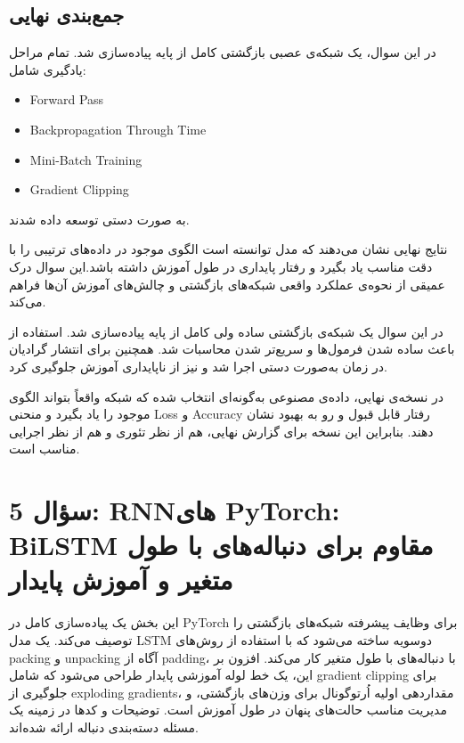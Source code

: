 \documentclass[12pt,a4paper]{article}
\begin{document}
\subsection{جمع‌بندی نهایی}



\begin{tcolorbox}[
colback=softgreen,
colframe=mygreen,
title={نتیجه‌ی نهایی},
fonttitle=\bfseries
]

در این سوال، یک شبکه‌ی عصبی بازگشتی کامل از پایه پیاده‌سازی شد.
تمام مراحل یادگیری شامل:
\begin{itemize}
	\item Forward Pass
	\item Backpropagation Through Time
	\item Mini-Batch Training
	\item Gradient Clipping
\end{itemize}
به صورت دستی توسعه داده شدند.

نتایج نهایی نشان می‌دهند که مدل توانسته است الگوی موجود در داده‌های ترتیبی
را با دقت مناسب یاد بگیرد و رفتار پایداری در طول آموزش داشته باشد.این سوال درک عمیقی از نحوه‌ی عملکرد واقعی شبکه‌های بازگشتی و چالش‌های
آموزش آن‌ها فراهم می‌کند.

در این سوال یک شبکه‌ی بازگشتی ساده ولی کامل از پایه پیاده‌سازی شد.
استفاده از  باعث ساده شدن فرمول‌ها و سریع‌تر شدن محاسبات شد.
همچنین  برای انتشار گرادیان در زمان به‌صورت دستی اجرا شد و
 نیز از ناپایداری آموزش جلوگیری کرد.

در نسخه‌ی نهایی، داده‌ی مصنوعی به‌گونه‌ای انتخاب شده که شبکه واقعاً بتواند
الگوی موجود را یاد بگیرد و منحنی Loss و Accuracy رفتار قابل قبول و رو به بهبود
نشان دهند. بنابراین این نسخه برای گزارش نهایی، هم از نظر تئوری و هم از نظر
اجرایی مناسب است.
\end{tcolorbox}
\section{سؤال 5: RNNهای PyTorch: BiLSTM مقاوم برای دنباله‌های با طول متغیر و آموزش پایدار}


این بخش یک پیاده‌سازی کامل در PyTorch برای وظایف پیشرفته شبکه‌های بازگشتی را توصیف می‌کند. یک مدل LSTM دو‌سویه ساخته می‌شود که با استفاده از روش‌های packing و unpacking آگاه از padding، با دنباله‌های با طول متغیر کار می‌کند. افزون بر این، یک خط لوله آموزشی پایدار طراحی می‌شود که شامل gradient clipping برای جلوگیری از exploding gradients، مقداردهی اولیه اُرتوگونال برای وزن‌های بازگشتی، و مدیریت مناسب حالت‌های پنهان در طول آموزش است. توضیحات و کدها در زمینه یک مسئله دسته‌بندی دنباله ارائه شده‌اند.
\end{document}

